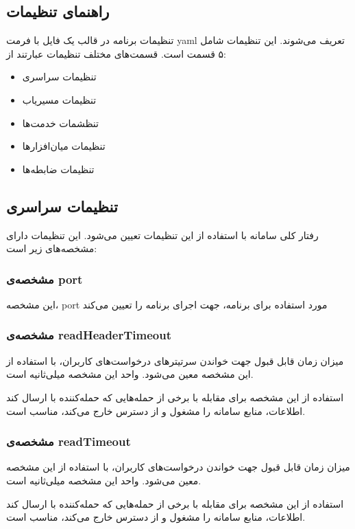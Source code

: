 \subsection*{راهنما‌ی تنظیمات}
تنظیمات برنامه در قالب یک فایل با فرمت yaml تعریف می‌شوند. این تنظیمات شامل ۵ قسمت است. قسمت‌های مختلف تنظیمات عبارتند از:

\begin{itemize}
    \item تنظیمات سراسری 
    \item تنظیمات مسیریاب
    \item تنظشمات خدمت‌ها
    \item تنظیمات میان‌افزار‌ها
    \item تنظیمات ضابطه‌ها
\end{itemize}

\subsection*{تنظیمات سراسری}
رفتار کلی سامانه با استفاده از این تنظیمات تعیین می‌شود. این تنظیمات دارای مشخصه‌های زیر است:

\subsubsection*{مشخصه‌ی port}
این مشخصه، port مورد استفاده برای برنامه، جهت اجرای برنامه را تعیین می‌کند

\subsubsection*{مشخصه‌ی readHeaderTimeout}
میزان زمان قابل قبول جهت خواندن سرتیتر‌های درخواست‌های کاربران، با استفاده از این مشخصه معین می‌شود. واحد این مشخصه میلی‌ثانیه است.

استفاده از این مشخصه برای مقابله با برخی از حمله‌هایی که حمله‌کننده با ارسال کند اطلاعات، منابع سامانه را مشغول و از دسترس خارج می‌کند، مناسب است.

\subsubsection*{مشخصه‌ی readTimeout}
میزان زمان قابل قبول جهت خواندن درخواست‌های کاربران، با استفاده از این مشخصه معین می‌شود. واحد این مشخصه میلی‌ثانیه است.

استفاده از این مشخصه برای مقابله با برخی از حمله‌هایی که حمله‌کننده با ارسال کند اطلاعات، منابع سامانه را مشغول و از دسترس خارج می‌کند، مناسب است.

